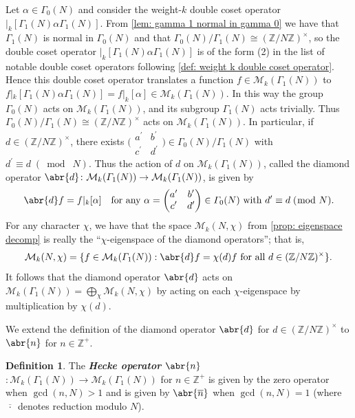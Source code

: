 \documentclass[10pt,leqno,twoside]{article}
\theoremstyle{plain}
\theoremstyle{definition}
\newtheorem{definition/}[lem]{Definition}
\newenvironment{definition}
  {\renewcommand{\qedsymbol}{\textdagger}%
   \pushQED{\qed}\begin{definition/}}
  {\popQED\end{definition/}}
\numberwithin{equation}{section}
\numberwithin{lem}{section}
\newcommand{\textib}[1]{\textbf{\textit{#1\index{#1}}}} %
\newcommand{\smod}[1]{\;(\bmod\; #1)}
\begin{document}
Let $\alpha\in\varGamma_0(N)$ and consider the weight-$k$ double coset operator $|_k[\varGamma_1(N)\alpha\varGamma_1(N)]$. From \cref{lem: gamma 1 normal in gamma 0} we have that $\varGamma_1(N)$ is normal in $\varGamma_0(N)$ and that $\varGamma_0(N)/\varGamma_1(N)\cong (\mathbb Z/N\mathbb Z)^\times$, so the double coset operator $|_k[\varGamma_1(N)\alpha\varGamma_1(N)]$ is of the form (2) in the list of notable double coset operators following \cref{def: weight k double coset operator}. Hence this double coset operator translates a function $f\in \mathcal M_k(\varGamma_1(N))$ to $f|_k[\varGamma_1(N)\alpha\varGamma_1(N)] = f|_k[\alpha]\in \mathcal M_k(\varGamma_1(N))$. In this way the group $\varGamma_0(N)$ acts on $\mathcal M_k(\varGamma_1(N))$, and its subgroup $\varGamma_1(N)$ acts trivially. Thus $\varGamma_0(N)/\varGamma_1(N)\cong (\mathbb Z/N\mathbb Z)^\times$ acts on $\mathcal M_k(\varGamma_1(N))$. In particular, if $d\in (\mathbb Z/N\mathbb Z)^\times$, there exists $\big(\!\begin{smallmatrix}
    a^\prime & b^\prime \\ c^\prime & d^\prime
\end{smallmatrix}\!\big)\in \varGamma_0(N)/\varGamma_1(N)$ with $d^\prime\equiv d\smod N$. Thus the action of $d$ on $\mathcal M_k(\varGamma_1(N))$, called the diamond operator $\abr{d}\colon \mathcal M_k(\varGamma_1(N))\to \mathcal M_k(\varGamma_1(N))$, is given by 
\[\abr{d}f = f|_k[\alpha] \quad \text{for any $\alpha = \begin{pmatrix}
    a^\prime & b^\prime \\ c^\prime & d^\prime
\end{pmatrix}\in \varGamma_0(N)$ with $d^\prime\equiv d\smod N$}.\]
For any character $\chi$, we have that the space $\mathcal M_k(N,\chi)$ from \cref{prop: eigenspace decomp} is really the ``$\chi$-eigenspace of the diamond operators''; that is,
\[\mathcal M_k(N,\chi) = \{f\in \mathcal M_k(\varGamma_1(N)) : \abr{d}f = \chi(d)f \text{ for all } d\in(\mathbb Z/N\mathbb Z)^\times\}.\] 
It follows that the diamond operator $\abr{d}$ acts on $\mathcal M_k(\varGamma_1(N)) = \bigoplus_\chi\mathcal M_k(N,\chi)$ by acting on each $\chi$-eigenspace by multiplication by $\chi(d)$.

We extend the definition of the diamond operator $\abr{d}$ for $d\in (\mathbb Z/N\mathbb Z)^\times$ to $\abr{n}$ for $n\in\mathbb{Z}^+$.
\begin{definition}
    The \textib{Hecke operator $\abr{n}$}$\colon \mathcal M_k(\varGamma_1(N))\to \mathcal M_k(\varGamma_1(N))$ for $n\in\mathbb{Z}^+$ is given by the zero operator when $\gcd(n,N)>1$ and is given by $\abr{\overline n}$ when $\gcd(n,N) = 1$ (where $\overline{\,\cdot\,}$ denotes reduction modulo $N$).
\end{definition}
\end{document}

